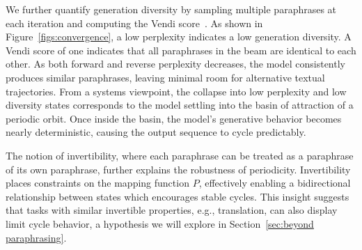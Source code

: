 We further quantify generation diversity by sampling multiple paraphrases at each iteration and computing the Vendi score~\cite{friedman2022vendi}. 
As shown in Figure~\ref{figs:convergence}, a low perplexity indicates a low generation diversity. 
A Vendi score of one indicates that all paraphrases in the beam are identical to each other.
As both forward and reverse perplexity decreases, the model consistently produces similar paraphrases, leaving minimal room for alternative textual trajectories. 
From a systems viewpoint, the collapse into low perplexity and low diversity states corresponds to the model settling into the basin of attraction of a periodic orbit. 
Once inside the basin, the model’s generative behavior becomes nearly deterministic, causing the output sequence to cycle predictably.


The notion of invertibility, where each paraphrase can be treated as a paraphrase of its own paraphrase, further explains the robustness of periodicity. 
Invertibility places constraints on the mapping function $P$, effectively enabling a bidirectional relationship between states which encourages stable cycles. 
This insight suggests that tasks with similar invertible properties, e.g., translation, can also display limit cycle behavior, a hypothesis we will explore in Section~\ref{sec:beyond paraphrasing}.






